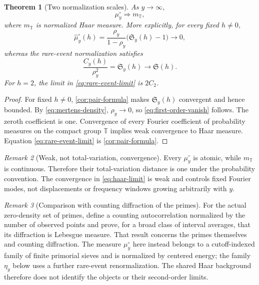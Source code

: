 \documentclass[11pt]{article}
\newtheorem{theorem}{Theorem}[section]
\theoremstyle{definition}
\theoremstyle{remark}
\newtheorem{remark}[theorem]{Remark}
\newcommand{\T}{\mathbb T}
\begin{document}
\begin{theorem}[Two normalization scales]\label{thm:two-scales}
As $y\to\infty$,
\begin{equation}\label{eq:haar-limit}
    \mu_y^\circ\Rightarrow m_{\T},
\end{equation}
where $m_{\T}$ is normalized Haar measure.  More explicitly, for every fixed $h\ne0$,
\begin{equation}\label{eq:first-order-vanish}
    \widehat\mu_y^\circ(h)
    =\frac{\rho_y}{1-\rho_y}
       \bigl(\mathfrak S_y(h)-1\bigr)
    \longrightarrow0,
\end{equation}
whereas the rare-event normalization satisfies
\begin{equation}\label{eq:rare-event-limit}
    \frac{C_y(h)}{\rho_y^2}
    =\mathfrak S_y(h)\longrightarrow\mathfrak S(h).
\end{equation}
For $h=2$, the limit in \eqref{eq:rare-event-limit} is $2C_2$.
\end{theorem}

\begin{proof}
For fixed $h\ne0$, \cref{cor:pair-formula} makes $\mathfrak S_y(h)$ convergent and hence bounded.  By \eqref{eq:mertens-density}, $\rho_y\to0$, so \eqref{eq:first-order-vanish} follows.  The zeroth coefficient is one.  Convergence of every Fourier coefficient of probability measures on the compact group $\T$ implies weak convergence to Haar measure.  Equation \eqref{eq:rare-event-limit} is \cref{cor:pair-formula}.
\end{proof}

\begin{remark}[Weak, not total-variation, convergence]\label{rem:not-tv}
Every $\mu_y^\circ$ is atomic, while $m_{\T}$ is continuous.  Therefore their total-variation distance is one under the probability convention.  The convergence in \eqref{eq:haar-limit} is weak and controls fixed Fourier modes, not displacements or frequency windows growing arbitrarily with $y$.
\end{remark}

\begin{remark}[Comparison with counting diffraction of the primes]\label{rem:prime-diffraction}
For the actual zero-density set of primes, \citet{HumeniukRamseyStrungaru2025} define a counting autocorrelation normalized by the number of observed points and prove, for a broad class of interval averages, that its diffraction is Lebesgue measure.  That result concerns the primes themselves and counting diffraction.  The measure $\mu_y^\circ$ here instead belongs to a cutoff-indexed family of finite primorial sieves and is normalized by centered energy; the family $\eta_y$ below uses a further rare-event renormalization.  The shared Haar background therefore does not identify the objects or their second-order limits.
\end{remark}
\end{document}
